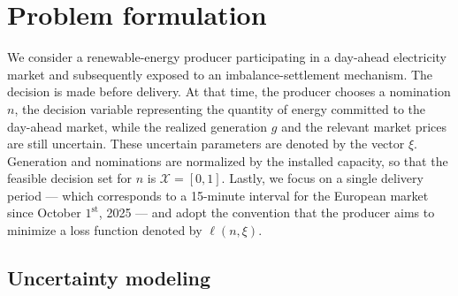 \documentclass[11pt]{article}
\theoremstyle{plain}
\theoremstyle{definition}
\begin{document}
\section{Problem formulation}
We consider a renewable-energy producer participating in a day-ahead electricity market and subsequently exposed to an imbalance-settlement mechanism. 
The decision is made before delivery. 
At that time, the producer chooses a nomination $n$, the decision variable representing the quantity of energy committed to the day-ahead market, while the realized generation $g$ and the relevant market prices are still uncertain.
These uncertain parameters are denoted by the vector $\xi$.
Generation and nominations are normalized by the installed capacity, so that the feasible decision set for $n$ is $\mathcal{X}=[0,1]$.
Lastly, we focus on a single delivery period — which corresponds to a 15-minute interval for the European market since October $1^{\text{st}}$, 2025 — and adopt the convention that the producer aims to minimize a loss function denoted by $\ell(n,\xi)$. 

\subsection{Uncertainty modeling} 
\label{subsec:uncertainty-modeling} 
\end{document}
